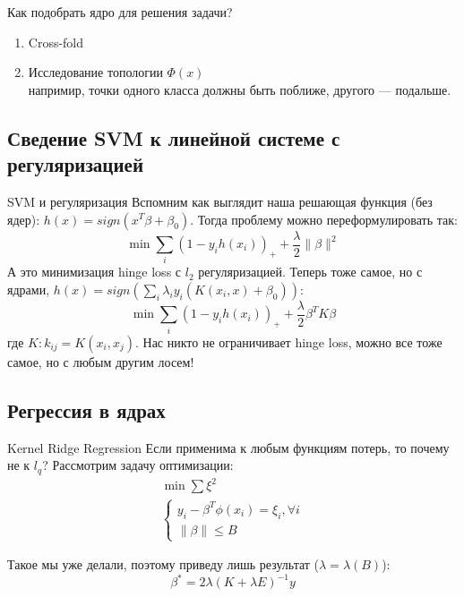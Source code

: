 \documentclass[14pt, fleqn, xcolor={dvipsnames, table}]{beamer}
\begin{document}
\begin{frame}{Как подобрать ядро для решения задачи?}
\begin{enumerate}
\item Cross-fold
\item Исследование топологии $\Phi(x)$ \\
\small напримир, точки одного класса должны быть поближе, другого --- подальше.
\end{enumerate}
\end{frame}

\subsection{Сведение SVM к линейной системе с регуляризацией} %

\begin{frame}{SVM и регуляризация}
\small
Вспомним как выглядит наша решающая функция (без ядер): $h(x) = sign(x^T \beta + \beta_0)$. Тогда проблему можно переформулировать так:
$$
\min \sum_i (1 - y_i h(x_i))_+ + \frac{\lambda}{2} \|\beta\|^2
$$
А это минимизация hinge loss с $l_2$ регуляризацией. Теперь тоже самое, но с ядрами, $h(x) = sign \left(\sum_i \lambda_i y_i (K(x_i, x) + \beta_0)\right)$:
$$
\min \sum_i (1 - y_i h(x_i))_+ + \frac{\lambda}{2} \beta^T K \beta
$$
где $K : k_{ij} = K(x_i, x_j)$. Нас никто не ограничивает hinge loss, можно все тоже самое, но с любым другим лосем!
\end{frame}

\subsection{Регрессия в ядрах}
\begin{frame}{Kernel Ridge Regression}
\small
Если применима к любым функциям потерь, то почему не к $l_q$? Рассмотрим задачу оптимизации:
$$\begin{array}{l}
\min \sum \xi^2 \\
\left\{\begin{array}{l}
  y_i - \beta^T \phi(x_i) = \xi_i, \forall i \\
  \|\beta\| \le B
\end{array}\right.
\end{array}$$

Такое мы уже делали, поэтому приведу лишь результат ($\lambda = \lambda(B)$):
$$
\beta^* = 2 \lambda \left(K + \lambda E\right)^{-1}y
$$
\end{frame}
\end{document}
